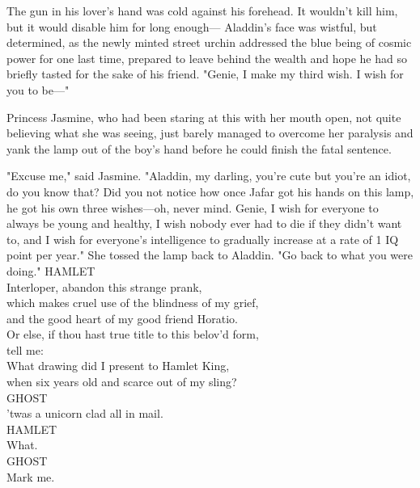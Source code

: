The gun in his lover's hand was cold against his forehead. It wouldn't kill
him, but it would disable him for long enough---
\sbreak%
\vspace{-2\baselineskip}
Aladdin's face was wistful, but determined, as the newly minted street urchin
addressed the blue being of cosmic power for one last time, prepared to leave
behind the wealth and hope he had so briefly tasted for the sake of his friend.
"Genie, I make my third wish. I wish for you to be---"

Princess Jasmine, who had been staring at this with her mouth open, not quite
believing what she was seeing, just barely managed to overcome her paralysis
and yank the lamp out of the boy's hand before he could finish the fatal
sentence.

"Excuse me," said Jasmine. "Aladdin, my darling, you're cute but you're an
idiot, do you know that? Did you not notice how once Jafar got his hands on
this lamp, he got his own three wishes---oh, never mind. Genie, I wish for
everyone to always be young and healthy, I wish nobody ever had to die if they
didn't want to, and I wish for everyone's intelligence to gradually increase at
a rate of 1 IQ point per year." She tossed the lamp back to Aladdin. "Go back
to what you were doing."
\sbreak%
\vspace{-2\baselineskip}
\noindent{}HAMLET\\
Interloper, abandon this strange prank,\\
which makes cruel use of the blindness of my grief,\\
and the good heart of my good friend Horatio.\\
Or else, if thou hast true title to this belov'd form,\\
tell me:\\
What drawing did I present to Hamlet King,\\
when six years old and scarce out of my sling?\\

\noindent{}GHOST\\
'twas a unicorn clad all in mail.\\

\noindent{}HAMLET\\
What.\\

\noindent{}GHOST\\
Mark me.\\

